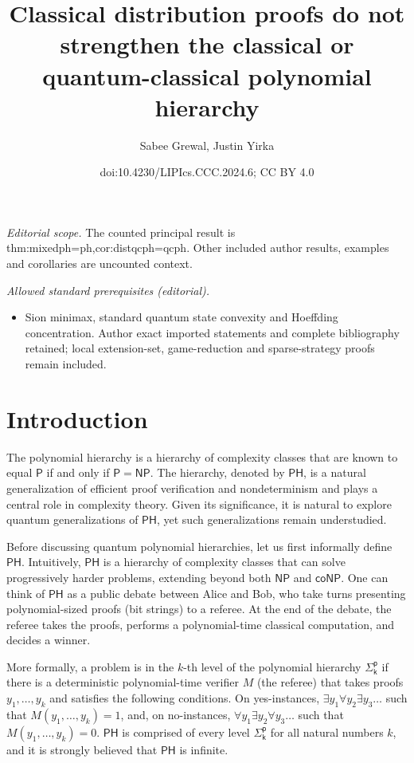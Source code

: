 \documentclass[10pt,a4paper]{article}
\title{Classical distribution proofs do not strengthen the classical or quantum-classical polynomial hierarchy}
\author{Sabee Grewal, Justin Yirka}
\date{doi:10.4230/LIPIcs.CCC.2024.6; CC BY 4.0}
\theoremstyle{definition}
\newcommand{\class}[1]{\ensuremath{\mathsf{#1}}\xspace}
\newcommand{\PTIME}{\class{P}}
\newcommand{\NP}{\class{NP}}
\newcommand{\coNP}{\class{coNP}}
\newcommand{\PH}{\class{PH}}
\newcommand{\Sigmai}[1][i]{\class{\Sigma^{p}_{#1}}}
\begin{document}
\maketitle
\noindent\textit{Editorial scope.} The counted principal result is thm:mixedph=ph,cor:distqcph=qcph. Other included author results, examples and corollaries are uncounted context.\par\medskip
\noindent\textit{Allowed standard prerequisites (editorial).}\begin{itemize}
\item Sion minimax, standard quantum state convexity and Hoeffding concentration. Author exact imported statements and complete bibliography retained; local extension-set, game-reduction and sparse-strategy proofs remain included.
\end{itemize}\medskip
\section{Introduction}\label{sec:intro}

The polynomial hierarchy \cite{meyer1972equivalence,stockmeyer1976polynomial} is a hierarchy of complexity classes that are known to equal $\PTIME$ if and only if $\PTIME = \NP$. 
The hierarchy, denoted by $\PH$, is a natural generalization of efficient proof verification and nondeterminism and plays a central role in complexity theory. 
Given its significance, it is natural to explore quantum generalizations of $\PH$, yet such generalizations remain understudied. 


Before discussing quantum polynomial hierarchies, let us first informally define $\PH$. 
Intuitively, $\PH$ is a hierarchy of complexity classes that can solve progressively harder problems, extending beyond both \NP and \coNP.
One can think of $\PH$ as a public debate between Alice and Bob, who take turns presenting polynomial-sized proofs (bit strings) to a referee. 
At the end of the debate, the referee takes the proofs, performs a polynomial-time classical computation, and decides a winner. 

More formally, a problem is in the $k$-th level of the polynomial hierarchy $\Sigmai[k]$ if there is a deterministic polynomial-time verifier $M$ (the referee) that takes proofs $y_1, \dots, y_k$ and satisfies the following conditions. On yes-instances, $\exists y_1 \forall y_2 \exists y_3 \ldots$ such that $M(y_1,\ldots,y_k)=1$, and, on no-instances, $\forall y_1 \exists y_2 \forall y_3 \ldots$ such that $M(y_1,\ldots,y_k)=0$. $\PH$ is comprised of every level $\Sigmai[k]$ for all natural numbers $k$, and it is strongly believed that $\PH$ is infinite.
\end{document}
